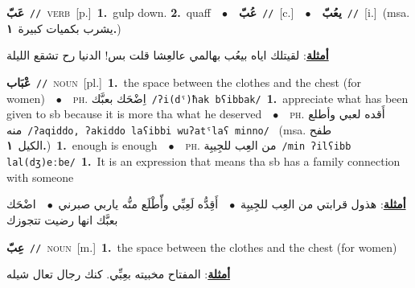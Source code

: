 \documentclass[10pt,a4paper,twoside]{article} %
\begin{document}
\begin{multicols}{2}
{\setlength\topsep{0pt}\textbf{\foreignlanguage{arabic}{عَبّ}}\ {\color{gray}\texttt{//}\color{black}}\ \textsc{verb}\ [p.]\ \textbf{1.}~gulp down.  \textbf{2.}~quaff\ \ $\bullet$\ \ \setlength\topsep{0pt}\textbf{\foreignlanguage{arabic}{عُبّ}}\ {\color{gray}\texttt{//}\color{black}}\ [c.]\ \ $\bullet$\ \ \setlength\topsep{0pt}\textbf{\foreignlanguage{arabic}{يعُبّ}}\ {\color{gray}\texttt{//}\color{black}}\ [i.]\ \color{gray}(msa. \foreignlanguage{arabic}{يشرب بكميات كبيرة}~\foreignlanguage{arabic}{\textbf{١.}})\color{black}\  \begin{flushright}\color{gray}\foreignlanguage{arabic}{\textbf{\underline{\foreignlanguage{arabic}{أمثلة}}}: لقيتلك اياه بيعُب بهالمي عالعِشا قلت بس! الدنيا رح تشقع الليلة}\end{flushright}\color{black}} \vspace{2mm}

{\setlength\topsep{0pt}\textbf{\foreignlanguage{arabic}{عْبَاب}}\ {\color{gray}\texttt{//}\color{black}}\ \textsc{noun}\ [pl.]\ \textbf{1.}~the space between the clothes and the chest (for women)\ \ $\bullet$\ \ \textsc{ph.} \color{gray} \foreignlanguage{arabic}{اِضْحَك بعبَّك}\color{black}\ {\color{gray}\texttt{/{\sffamily ʔi(dˤ)ħak bʕibbak}/}\color{black}}\ \textbf{1.}~appreciate what has been given to sb because it is more tha what he deserved\ \ $\bullet$\ \ \textsc{ph.} \color{gray} \foreignlanguage{arabic}{أَقده لعبي وأطلع منه}\color{black}\ {\color{gray}\texttt{/{\sffamily ʔaqiddo, ʔakiddo laʕibbi wuʔatˤlaʕ minno}/}\color{black}}\ \color{gray} (msa. \foreignlanguage{arabic}{طفح الكيل}~\foreignlanguage{arabic}{\textbf{١.}})\color{black}\ \textbf{1.}~enough is enough\ \ $\bullet$\ \ \textsc{ph.} \color{gray} \foreignlanguage{arabic}{من العِب للجِيبِة}\color{black}\ {\color{gray}\texttt{/{\sffamily min ʔilʕibb lal(dʒ)eːbe}/}\color{black}}\ \textbf{1.}~It is an expression that means tha sb has a family connection with someone\  \begin{flushright}\color{gray}\foreignlanguage{arabic}{\textbf{\underline{\foreignlanguage{arabic}{أمثلة}}}: هذول قرابتي من العِب للجِيبِة\ $\bullet$\ \  أَقِدُّه لَعِبِّي وأّطْلَع منُّه ياربي صبرني\ $\bullet$\ \  اضْحَك بعبَّك انها رضيت تتجوزك}\end{flushright}\color{black}} \vspace{2mm}

{\setlength\topsep{0pt}\textbf{\foreignlanguage{arabic}{عِبّ}}\ {\color{gray}\texttt{//}\color{black}}\ \textsc{noun}\ [m.]\ \textbf{1.}~the space between the clothes and the chest (for women)\  \begin{flushright}\color{gray}\foreignlanguage{arabic}{\textbf{\underline{\foreignlanguage{arabic}{أمثلة}}}: المفتاح مخبيته بعِبِّي. كنك رجال تعال شيله}\end{flushright}\color{black}} \vspace{2mm}


\end{multicols}
\end{document}
